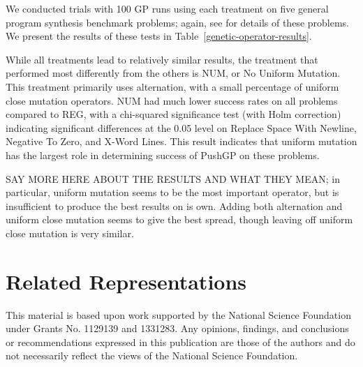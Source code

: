 We conducted trials with 100 GP runs using each treatment on five general program synthesis benchmark problems; again, see \cite{Helmuth:2015:GECCO} for details of these problems. We present the results of these tests in Table~\ref{genetic-operator-results}.

While all treatments lead to relatively similar results, the treatment that performed most differently from the others is NUM, or No Uniform Mutation. This treatment primarily uses alternation, with a small percentage of uniform close mutation operators. NUM had much lower success rates on all problems compared to REG, with a chi-squared significance test (with Holm correction) indicating significant differences at the 0.05 level on Replace Space With Newline, Negative To Zero, and X-Word Lines. This result indicates that uniform mutation has the largest role in determining success of PushGP on these problems.


SAY MORE HERE ABOUT THE RESULTS AND WHAT THEY MEAN; in particular, uniform mutation seems to be the most important operator, but is insufficient to produce the best results on is own. Adding both alternation and uniform close mutation seems to give the best spread, though leaving off uniform close mutation is very similar.



\section{Related Representations}







\begin{acknowledgement}
This material is based upon work supported by the National Science Foundation under Grants No. 1129139 and 1331283. Any opinions, findings, and conclusions or recommendations expressed in this publication are those of the authors and do not necessarily reflect the views of the National Science Foundation.
\end{acknowledgement}
%




